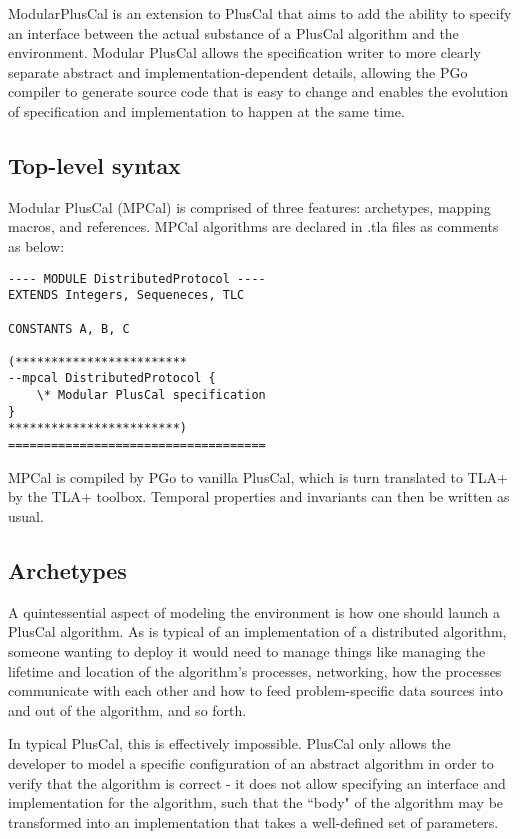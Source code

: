 ModularPlusCal is an extension to PlusCal that aims to add the ability to specify an interface between the actual substance of a PlusCal algorithm and the environment. Modular PlusCal allows the specification writer to more clearly separate abstract and implementation-dependent details, allowing the PGo compiler to generate source code that is easy to change and enables the evolution of specification and implementation to happen at the same time.

\subsection{Top-level syntax}

Modular PlusCal (MPCal) is comprised of three features: archetypes, mapping macros, and references. MPCal algorithms are declared in .tla files as comments as below:

\begin{lstlisting}[language=pcal]
---- MODULE DistributedProtocol ----
EXTENDS Integers, Sequeneces, TLC

CONSTANTS A, B, C

(************************
--mpcal DistributedProtocol {
    \* Modular PlusCal specification
}
************************)
====================================
\end{lstlisting}

MPCal is compiled by PGo to vanilla PlusCal, which is turn translated to TLA+ by the TLA+ toolbox. Temporal properties and invariants can then be written as usual.

\subsection{Archetypes}

A quintessential aspect of modeling the environment is how one should launch a PlusCal algorithm. As is typical of an implementation of a distributed algorithm, someone wanting to deploy it would need to manage things like managing the lifetime and location of the algorithm's processes, networking, how the processes communicate with each other and how to feed problem-specific data sources into and out of the algorithm, and so forth.

In typical PlusCal, this is effectively impossible. PlusCal only allows the developer to model a specific configuration of an abstract algorithm in order to verify that the algorithm is correct - it does not allow specifying an interface and implementation for the algorithm, such that the ``body" of the algorithm may be transformed into an implementation that takes a well-defined set of parameters.

